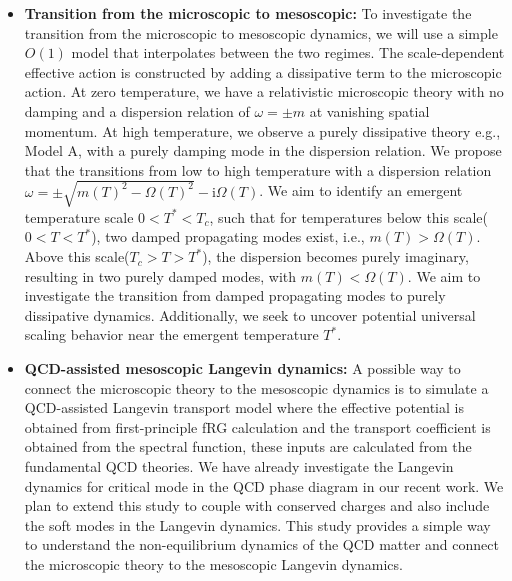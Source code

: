 \documentclass[letterpaper,11pt]{article}
\begin{document}
\begin{itemize}
\item {\bf Transition from the microscopic to mesoscopic:} To investigate the transition from the microscopic to mesoscopic dynamics, we will use a simple $O(1)$ model that interpolates between the two regimes. The scale-dependent effective action is constructed by adding a dissipative term to the microscopic action. 
At zero temperature, we have a relativistic microscopic theory with no damping and a dispersion relation of $\omega = \pm m$ at vanishing spatial momentum. At high temperature, we observe a purely dissipative theory e.g., Model A, with a purely damping mode in the dispersion relation. We propose that the transitions from low to high temperature with a dispersion relation $\omega = \pm \sqrt{m(T)^2 - \Omega(T)^2} - \mathrm{i}\Omega(T)$. We aim to identify an emergent temperature scale $0 < T^* < T_c$, such that for temperatures below this scale($0 < T < T^*$), two damped propagating modes exist, i.e., $m(T) > \Omega(T)$. Above this scale($T_c>T > T^*$), the dispersion becomes purely imaginary, resulting in two purely damped modes, with $m(T) < \Omega(T)$. We aim to investigate the transition from damped propagating modes to purely dissipative dynamics. Additionally, we seek to uncover potential universal scaling behavior near the emergent temperature $T^*$.

\item {\bf QCD-assisted mesoscopic Langevin dynamics:} A possible way to connect the microscopic theory to the mesoscopic dynamics is to simulate a QCD-assisted Langevin transport model where the effective potential is obtained from first-principle fRG calculation and the transport coefficient is obtained from the spectral function, these inputs are calculated from the fundamental QCD theories. We have already investigate the Langevin dynamics for critical mode in the QCD phase diagram in our recent work. We plan to extend this study to couple with conserved charges and also include the soft modes in the Langevin dynamics. This study provides a simple way to understand the non-equilibrium dynamics of the QCD matter and connect the microscopic theory to the mesoscopic Langevin dynamics.
\end{itemize}
\end{document}
